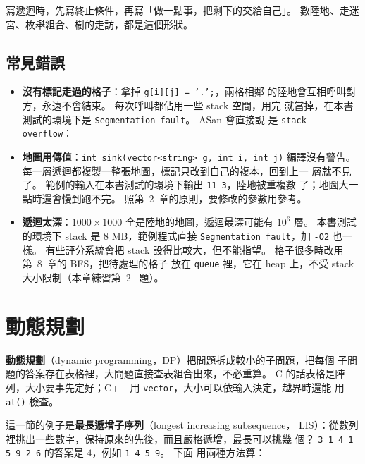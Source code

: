 寫遞迴時，先寫終止條件，再寫「做一點事，把剩下的交給自己」。 數陸地、走迷
宮、枚舉組合、樹的走訪，都是這個形狀。

\subsection{常見錯誤}

\begin{itemize}
\item \textbf{沒有標記走過的格子}：拿掉 \texttt{g[i][j] = '.';}，兩格相鄰
的陸地會互相呼叫對方，永遠不會結束。 每次呼叫都佔用一些 stack 空間，用完
就當掉，在本書測試的環境下是 \texttt{Segmentation fault}。 ASan 會直接說
是 \texttt{stack-overflow}：
\item \textbf{地圖用傳值}：\texttt{int sink(vector<string> g, int i, int j)}
編譯沒有警告。 每一層遞迴都複製一整張地圖，標記只改到自己的複本，回到上一
層就不見了。 範例的輸入在本書測試的環境下輸出 \texttt{11 3}，陸地被重複數
了；地圖大一點時還會慢到跑不完。 照第~2~章的原則，要修改的參數用參考。
\item \textbf{遞迴太深}：$1000 \times 1000$ 全是陸地的地圖，遞迴最深可能有
$10^6$ 層。 本書測試的環境下 stack 是 $8$ MB，範例程式直接
\texttt{Segmentation fault}，加 \texttt{-O2} 也一樣。 有些評分系統會把
stack 設得比較大，但不能指望。 格子很多時改用第~8~章的 BFS，把待處理的格子
放在 \texttt{queue} 裡，它在 heap 上，不受 stack 大小限制（本章練習第~2~
題）。
\end{itemize}

\section{動態規劃}
\label{sec:dp}

\textbf{動態規劃}（dynamic programming，DP）把問題拆成較小的子問題，把每個
子問題的答案存在表格裡，大問題直接查表組合出來，不必重算。 C 的話表格是陣
列，大小要事先定好；C++ 用 \texttt{vector}，大小可以依輸入決定，越界時還能
用 \texttt{at()} 檢查。

這一節的例子是\textbf{最長遞增子序列}（longest increasing subsequence，
LIS）：從數列裡挑出一些數字，保持原來的先後，而且嚴格遞增，最長可以挑幾
個？ \texttt{3 1 4 1 5 9 2 6} 的答案是 $4$，例如 \texttt{1 4 5 9}。 下面
用兩種方法算：

